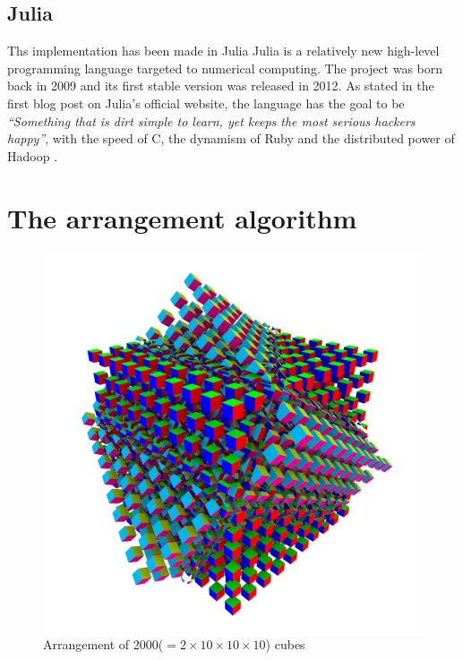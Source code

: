 \section{Julia}

Ths implementation has been made in Julia
Julia is a relatively new high-level programming language targeted 
to numerical computing. The project was born back in 2009 and its first
stable version was released in 2012. As stated in the first blog post
on Julia's official website, the language has the goal
to be \textit{``Something that is dirt simple to learn, 
yet keeps the most serious hackers happy''}, with the speed of C, 
the dynamism of Ruby and the distributed power of Hadoop
\cite{julia}.


\chapter{The arrangement algorithm}
\label{ch:arrangement_algorithm}

\begin{figure}[H]
    \centering
    \includegraphics[width=\textwidth]{./img/cube10x10.pdf}
    \caption{Arrangement of 2000($=2\times10\times10\times10$) cubes}
\end{figure}





